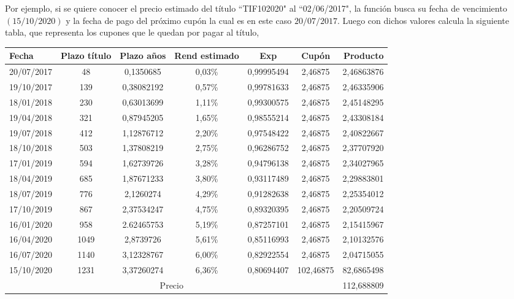 \hspace{0.4cm} Por ejemplo, si se quiere conocer el precio estimado del t\'itulo ``TIF102020" al ``02/06/2017", la funci\'on busca su fecha de vencimiento $(15/10/2020)$ y la fecha de pago del pr\'oximo cup\'on la cual es en este caso $20/07/2017$. Luego con dichos valores calcula la siguiente tabla, que representa los cupones que le quedan por pagar al t\'itulo,



\begin{tabular}[t]{|l |c |c |c |c |c |r|}
\hline
Fecha & Plazo t\'itulo & Plazo a\~nos & Rend estimado & Exp & Cup\'on & Producto \\
\hline
20/07/2017 & 48  & 0,1350685 & 0,03\% & 0,99995494& 2,46875& 2,46863876\\
\hline
19/10/2017 & 139 & 0,38082192 & 0,57\% & 0,99781633& 2,46875& 2,46335906\\
\hline
18/01/2018 & 230 & 0,63013699 & 1,11\% & 0,99300575& 2,46875& 2,45148295\\
\hline
19/04/2018 & 321 & 0,87945205 & 1,65\% & 0,98555214& 2,46875& 2,43308184\\
\hline
19/07/2018 & 412 & 1,12876712 & 2,20\% & 0,97548422& 2,46875& 2,40822667\\
\hline
18/10/2018 & 503 & 1,37808219 & 2,75\% & 0,96286752& 2,46875& 2,37707920\\
\hline
17/01/2019 & 594 & 1,62739726 & 3,28\% & 0,94796138& 2,46875& 2,34027965\\
\hline
18/04/2019 & 685 & 1,87671233 & 3,80\% & 0,93117489& 2,46875& 2,29883801\\
\hline
18/07/2019 & 776 & 2,1260274 & 4,29\% & 0,91282638& 2,46875& 2,25354012\\
\hline
17/10/2019 & 867 & 2,37534247 & 4,75\% & 0,89320395& 2,46875& 2,20509724\\
\hline
16/01/2020 & 958 & 2.62465753 & 5,19\% & 0,87257101& 2,46875& 2,15415967\\
\hline
16/04/2020 & 1049 & 2,8739726 & 5,61\% & 0,85116993& 2,46875& 2,10132576\\
\hline
16/07/2020 & 1140 & 3,12328767 & 6,00\% & 0,82922554& 2,46875& 2,04715055\\
\hline
15/10/2020 & 1231 & 3,37260274 & 6,36\% & 0,80694407& 102,46875& 82,6865498\\
\hline
\multicolumn{6}{|c|}{Precio} & 112,688809 \\
\hline
\end{tabular}

